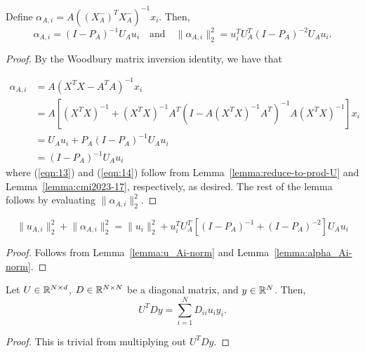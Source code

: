 \begin{lemma} \label{lemma:alpha_Ai-norm}
    Define  $\alpha_{A, i} = A((X_A^-)^T X_A^-)^{-1}x_i$. Then,
    \begin{equation}
        \alpha_{A, i} = (I - P_A)^{-1} U_A u_i
    \quad \text{and} \quad
        \lVert \alpha_{A, i} \rVert_2^2 = u_i^T U_A^T (I - P_A)^{-2} U_A u_i.
    \end{equation}
\end{lemma}
\begin{proof}
    By the Woodbury matrix inversion identity, we have that

    \begin{align}
        \alpha_{A, i} &= A(X^T X - A^T A)^{-1} x_i\\
            &= A \left[ (X^T X)^{-1} + (X^T X)^{-1} A^T \left( I - A(X^T X)^{-1}A^T \right)^{-1} A (X^T X)^{-1}  \right] x_i\\
            &= U_A u_i + P_A (I - P_A)^{-1} U_A u_i \label{eqn:13}\\
            &= (I - P_A)^{-1} U_A u_i \label{eqn:14}
    \end{align}
    where (\ref{eqn:13}) and (\ref{eqn:14}) follow from Lemma~\ref{lemma:reduce-to-prod-U} and Lemma~\ref{lemma:cmi2023-17}, respectively, as desired. The rest of the lemma follows by evaluating $\lVert \alpha_{A, i} \rVert_2^2$.
\end{proof}


\begin{lemma} \label{lemma:sum-norm-u-alpha}
    \begin{equation}
        \lVert u_{A, i} \rVert_2^2  + \lVert \alpha_{A, i} \rVert_2^2 = \lVert u_i \rVert_2^2 +  u_i^T U_A^T \left[ (I - P_A)^{-1} + (I - P_A)^{-2} \right] U_A u_i 
    \end{equation}
\end{lemma}
\begin{proof}
    Follows from Lemma~\ref{lemma:u_Ai-norm} and Lemma~\ref{lemma:alpha_Ai-norm}.
\end{proof}



\begin{lemma} \label{lemma:UtDy}
    Let $U \in \mathbb{R}^{N \times d}$, $D \in \mathbb{R}^{N \times N}$ be a diagonal matrix, and $y \in \mathbb{R}^N$. Then,
    \begin{equation}
        U^T D y = \sum_{i=1}^N D_{ii} u_i y_i.
    \end{equation}
\end{lemma}
\begin{proof}
    This is trivial from multiplying out $U^T D y$.
\end{proof}






